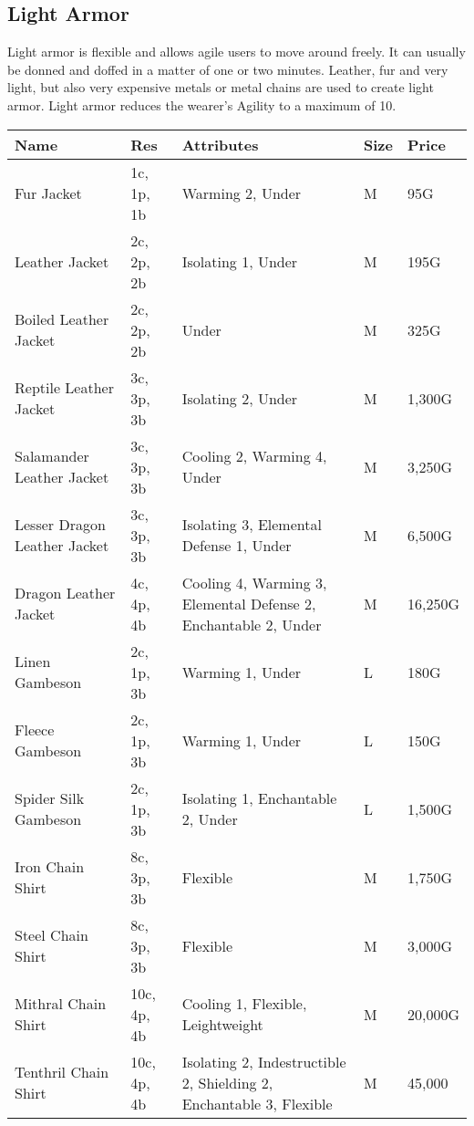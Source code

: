 
\onecolumn
\subsection{Light Armor}

Light armor is flexible and allows agile users to move around freely. It can usually be donned and doffed in a matter of one or two minutes. Leather, fur and very light, but also very expensive metals or metal chains are used to create light armor.
Light armor reduces the wearer's Agility to a maximum of 10. 

\begin{longtable}{p{3.5cm} | p{1.5cm} | p{5cm} | p{1cm} | p{1.25cm}}
	Name & Res &  Attributes & Size & Price\\ \hline
	Fur Jacket & 1c, 1p, 1b & Warming 2, Under & M & 95G\\
	
	Leather Jacket & 2c, 2p, 2b & Isolating 1, Under & M & 195G\\
	
	Boiled Leather Jacket & 2c, 2p, 2b & Under & M & 325G\\
	
	Reptile Leather Jacket & 3c, 3p, 3b & Isolating 2, Under & M & 1,300G\\
	
	Salamander Leather Jacket & 3c, 3p, 3b & Cooling 2, Warming 4, Under & M & 3,250G\\
	
	Lesser Dragon Leather Jacket & 3c, 3p, 3b & Isolating 3, Elemental Defense 1, Under & M & 6,500G\\
	
	Dragon Leather Jacket & 4c, 4p, 4b & Cooling 4, Warming 3, Elemental Defense 2, Enchantable 2, Under & M & 16,250G\\
	
	Linen Gambeson & 2c, 1p, 3b & Warming 1, Under & L & 180G\\
	
	Fleece Gambeson & 2c, 1p, 3b & Warming 1, Under & L & 150G\\
	
	Spider Silk Gambeson & 2c, 1p, 3b & Isolating 1, Enchantable 2, Under & L & 1,500G\\
	
	Iron Chain Shirt & 8c, 3p, 3b & Flexible & M & 1,750G\\
	
	Steel Chain Shirt & 8c, 3p, 3b & Flexible & M & 3,000G\\
	
	Mithral Chain Shirt & 10c, 4p, 4b & Cooling 1, Flexible, Leightweight & M & 20,000G\\
	
	Tenthril Chain Shirt & 10c, 4p, 4b & Isolating 2, Indestructible 2, Shielding 2, Enchantable 3, Flexible & M & 45,000\\
\end{longtable}
\twocolumn